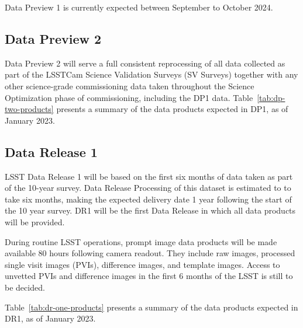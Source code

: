 Data Preview 1 is currently expected between September to October 2024. 

\subsection{Data Preview 2}

Data Preview 2 will serve a full consistent reprocessing of all data collected as part of the LSSTCam Science Validation Surveys (SV Surveys) together with any other science-grade commissioning data taken throughout the Science Optimization phase of commissioning, including the DP1 data. 
Table~\ref{tab:dp-two-products} presents a summary of the data products expected in DP1, as of January 2023.

\subsection{Data Release 1}

LSST Data Release 1 will be based on the first six months of data taken as part of the 10-year survey. 
Data Release Processing of this dataset is estimated to to take six months, making the expected delivery date 1 year following the start of the 10 year survey. 
DR1 will be the first Data Release in which all data products will be provided. 

During routine LSST operations, prompt image data products will be made available 80 hours following camera readout.
They include raw images, processed single visit images (PVIs), difference images, and template images.
Access to unvetted PVIs and difference images in the first 6 months of the LSST is still to be decided.

Table~\ref{tab:dr-one-products} presents a summary of the data products expected in DR1, as of January 2023.


